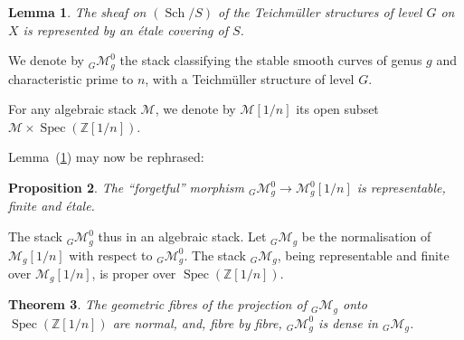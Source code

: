 \documentclass[10pt]{amsart}
\theoremstyle{plain}
\newtheorem{theorem}{Theorem}[section]
\newtheorem{lemma}[theorem]{Lemma}
\newtheorem{proposition}[theorem]{Proposition}
\theoremstyle{definition}
\DeclareMathOperator{\Spec}{Spec}
\DeclareMathOperator{\Sch}{Sch}
\begin{document}
\begin{lemma}\label{lem:5.7}
The sheaf on $(\Sch/S)$ of the Teichm\"uller structures of level $G$ on $X$ is represented by an \'etale covering of $S$.
\end{lemma}

We denote by $_G\mathscr{M}_g^0$ the stack classifying the stable smooth curves of genus $g$ and characteristic prime to $n$, with a Teichm\"uller structure of level $G$.

For any algebraic stack $\mathscr{M}$, we denote by $\mathscr{M}[1/n]$ its open subset $\mathscr{M} \times \Spec(\mathbb{Z}[1/n])$.

Lemma~(\ref{lem:5.7}) may now be rephrased:

\begin{proposition}\label{prop:5.8}
The ``forgetful'' morphism $_G\mathscr{M}_g^0 \to \mathscr{M}_g^0[1/n]$ is representable, finite and \'etale.
\end{proposition}

The stack $_G\mathscr{M}_g^0$ thus in an algebraic stack. Let $_G\mathscr{M}_g$ be the normalisation of $\mathscr{M}_g[1/n]$ with respect to $_G\mathscr{M}_g^0$. The stack $_G\mathscr{M}_g$, being representable and finite over $\mathscr{M}_g[1/n]$, is proper over $\Spec(\mathbb{Z}[1/n])$.

\begin{theorem}\label{thm:5.9}
The geometric fibres of the projection of $_G\mathscr{M}_g$ onto $\Spec(\mathbb{Z}[1/n])$ are normal, and, fibre by fibre, $_G\mathscr{M}_g^0$ is dense in $_G\mathscr{M}_g$.
\end{theorem}
\end{document}
